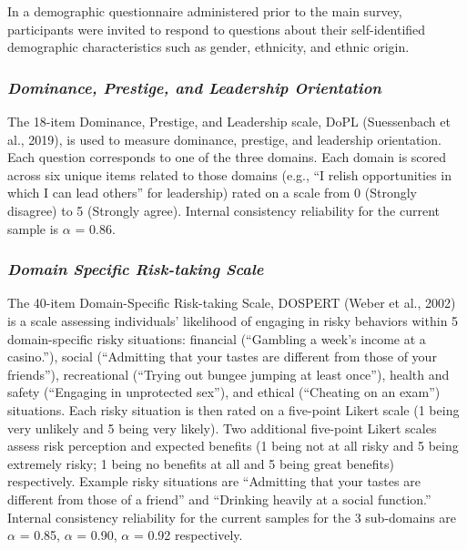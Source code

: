 \documentclass[
  english,
  a4paper,floatsintext]{apa7}
\begin{document}
In a demographic questionnaire administered prior to the main survey, participants were invited to respond to questions about their self-identified demographic characteristics such as gender, ethnicity, and ethnic origin.

\hypertarget{dominance-prestige-and-leadership-orientation-1}{%
\subsubsection{\texorpdfstring{\emph{Dominance, Prestige, and Leadership Orientation}}{Dominance, Prestige, and Leadership Orientation}}\label{dominance-prestige-and-leadership-orientation-1}}

The 18-item Dominance, Prestige, and Leadership scale, DoPL (Suessenbach et al., 2019), is used to measure dominance, prestige, and leadership orientation. Each question corresponds to one of the three domains. Each domain is scored across six unique items related to those domains (e.g., ``I relish opportunities in which I can lead others'' for leadership) rated on a scale from 0 (Strongly disagree) to 5 (Strongly agree). Internal consistency reliability for the current sample is \(\alpha\) = 0.86.

\hypertarget{domain-specific-risk-taking-scale}{%
\subsubsection{\texorpdfstring{\emph{Domain Specific Risk-taking Scale}}{Domain Specific Risk-taking Scale}}\label{domain-specific-risk-taking-scale}}

The 40-item Domain-Specific Risk-taking Scale, DOSPERT (Weber et al., 2002) is a scale assessing individuals' likelihood of engaging in risky behaviors within 5 domain-specific risky situations: financial (``Gambling a week's income at a casino.''), social (``Admitting that your tastes are different from those of your friends''), recreational (``Trying out bungee jumping at least once''), health and safety (``Engaging in unprotected sex''), and ethical (``Cheating on an exam'') situations. Each risky situation is then rated on a five-point Likert scale (1 being very unlikely and 5 being very likely). Two additional five-point Likert scales assess risk perception and expected benefits (1 being not at all risky and 5 being extremely risky; 1 being no benefits at all and 5 being great benefits) respectively. Example risky situations are ``Admitting that your tastes are different from those of a friend'' and ``Drinking heavily at a social function.'' Internal consistency reliability for the current samples for the 3 sub-domains are \(\alpha\) = 0.85, \(\alpha\) = 0.90, \(\alpha\) = 0.92 respectively.
\end{document}
